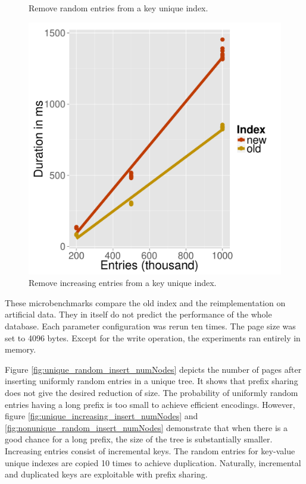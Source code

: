 \documentclass[11pt,a4paper,oneside]{article}
\begin{document}
\begin{figure}[p]
{\begin{minipage}{0.3\textwidth}
      \caption{Remove random entries from a key unique index.}
      \label{fig:unique_random_remove_numNodes}
      \end{minipage}
      \hspace{0.05\textwidth}
      \begin{minipage}{0.3\textwidth}
      \includegraphics[scale=0.30]{images/unique_increasing_remove.pdf} 
      \caption{Remove increasing entries from a key unique index.}
      \label{fig:unique_increasing_remove}
      \end{minipage}
    }
\end{figure}

These microbenchmarks compare the old index and the reimplementation on artificial data. 
They in itself do not predict the performance of the whole database.
Each parameter configuration was rerun ten times. 
The page size was set to 4096 bytes.
Except for the write operation, the experiments ran entirely in memory.

Figure \ref{fig:unique_random_insert_numNodes} depicts the number of pages after inserting uniformly random entries in a unique tree.
It shows that prefix sharing does not give the desired reduction of size.
The probability of uniformly random entries having a long prefix is too small to achieve efficient encodings.
However, figure \ref{fig:unique_increasing_insert_numNodes} and \ref{fig:nonunique_random_insert_numNodes} demonstrate 
that when there is a good chance for a long prefix, the size of the tree is substantially smaller.
Increasing entries consist of incremental keys. The random entries for key-value unique indexes are copied 10 times to achieve duplication.
Naturally, incremental and duplicated keys are exploitable with prefix sharing.
\end{document}
